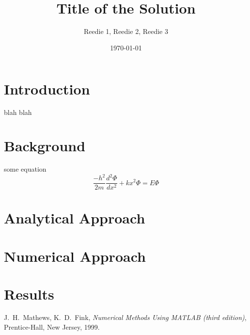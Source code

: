 \documentclass[12pt]{report}
\title{\textbf{Title of the Solution}}
\author{Reedie 1, Reedie 2, Reedie 3}
\date{\today}
\begin{document}
\maketitle


\tableofcontents

\section{Introduction}
blah blah\cite{MF}

\section{Background}

some equation
\begin{equation*}
  \frac{−h^2}{2m} \frac{d^2\Phi}{dx^2} + kx^2\Phi = E\Phi
\end{equation*}

\section{Analytical Approach}

\section{Numerical Approach}

\section{Results}
\label{sec:RESULTS}


\begin{thebibliography}{99}
 J.~H.~Mathews, K.~D.~Fink, \emph{Numerical Methods Using MATLAB (third edition)},
                  Prentice-Hall, New Jersey, 1999.
\end{thebibliography}
\end{document}
